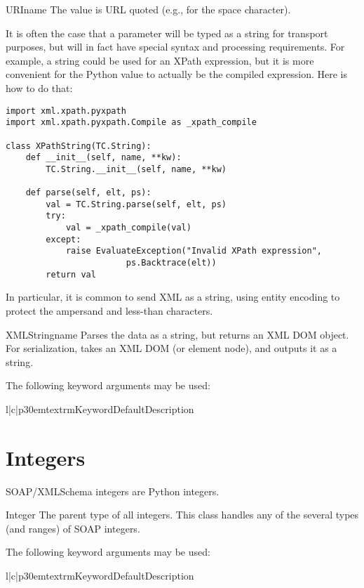 \begin{classdesc}{URI}{name}
The value is URL quoted (e.g.,  for the space character).
\end{classdesc}

It is often the case that a parameter will be typed as a string for
transport purposes, but will in fact have special syntax and processing
requirements.
For example, a string could be used for an XPath expression, but it is
more convenient for the Python value to
actually be the compiled expression. Here is how to do that:

\begin{verbatim}
import xml.xpath.pyxpath
import xml.xpath.pyxpath.Compile as _xpath_compile

class XPathString(TC.String):
    def __init__(self, name, **kw):
        TC.String.__init__(self, name, **kw)

    def parse(self, elt, ps):
        val = TC.String.parse(self, elt, ps)
        try:
            val = _xpath_compile(val)
        except:
            raise EvaluateException("Invalid XPath expression",
                        ps.Backtrace(elt))
        return val
\end{verbatim}

In particular, it is common to send XML as a string, using entity
encoding to protect the ampersand and less-than characters.

\begin{classdesc}{XMLString}{name}
Parses the data as a string, but returns an XML DOM object.
For serialization, takes an XML DOM (or element node), and outputs
it as a string.

The following keyword arguments may be used:

\begin{tableiii}{l|c|p{30em}}{textrm}{Keyword}{Default}{Description}
\end{tableiii}

\end{classdesc}

\section{Integers}

SOAP/XMLSchema integers are Python integers.

\begin{classdesc}{Integer}{}
The parent type of all integers.
This class handles any of the several types (and ranges) of SOAP integers.

The following keyword arguments may be used:

\begin{tableiii}{l|c|p{30em}}{textrm}{Keyword}{Default}{Description}
\end{tableiii}
\end{classdesc}

